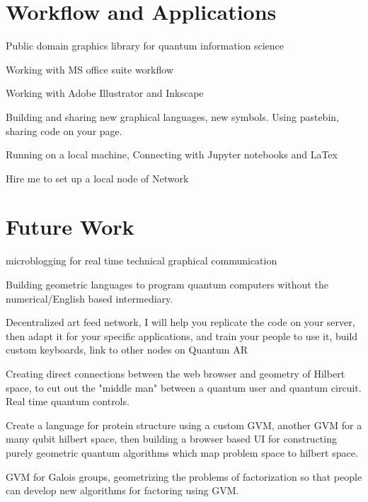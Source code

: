 \documentclass[11pt]{article}
\begin{document}
\section{
Workflow and Applications}



    Public domain graphics library for quantum information science




    Working with MS office suite workflow




    Working with Adobe Illustrator and Inkscape




    Building and sharing new graphical languages, new symbols.  Using pastebin, sharing code on your page.




    Running on a local machine, Connecting with Jupyter notebooks and LaTex



Hire me to set up a local node of Network


\section{
Future Work}



    microblogging for real time technical graphical communication




    Building geometric languages to program quantum computers without the numerical/English based intermediary.




    Decentralized art feed network, I will help you replicate the code on your server, then adapt it for your specific applications, and train your people to use it, build custom keyboards, link to other nodes on Quantum AR





Creating direct connections between the web browser and geometry of Hilbert space, to cut out the "middle man" between a quantum user and quantum circuit.  Real time quantum controls.    




    Create a language for protein structure using a custom GVM, another GVM for a many qubit hilbert space, then building a browser based UI for constructing purely geometric quantum algorithms which map problem space to hilbert space.  




    GVM for Galois groups, geometrizing the problems of factorization so that people can develop new algorithms for factoring using GVM.




    
\end{document}
